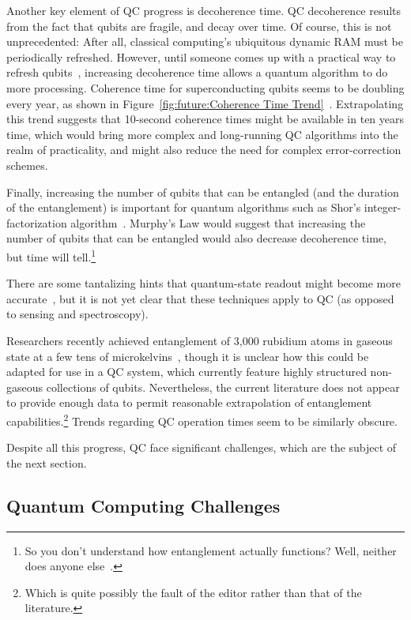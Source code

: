 Another key element of QC progress is decoherence time.
QC decoherence results from the fact that qubits are fragile, and
decay over time.
Of course, this is not unprecedented: After all, classical computing's
ubiquitous dynamic RAM must be periodically refreshed.
However, until someone comes up with a practical way to refresh
qubits~\cite{GiorgioColangelo2017QC-SpinAngleAmplitude},
increasing decoherence time allows a quantum algorithm to do more
processing.
Coherence time for superconducting qubits seems to be doubling every year,
as shown in
Figure~\ref{fig:future:Coherence Time Trend}~\cite{IBM2016QuantumExperience}.
Extrapolating this trend suggests that 10-second coherence times might
be available in ten years time, which would bring more complex and
long-running QC algorithms into the realm of practicality, and might
also reduce the need for complex error-correction schemes.

Finally, increasing the number of qubits that can be
entangled (and the duration of the entanglement) is important for
quantum algorithms such as Shor's integer-factorization
algorithm~\cite{Shor:1997:PAP:264393.264406,Kendon:2006:ERS:2011698.2011704}.
Murphy's Law would suggest that increasing the number of qubits that
can be entangled would also decrease decoherence time, but time will
tell.\footnote{
	So you don't understand how entanglement actually functions?
	Well, neither does anyone else~\cite{ScottAaronson2018QuantumInterp}.}

There are some tantalizing hints that quantum-state readout might become
more accurate~\cite{GiorgioColangelo2017QC-SpinAngleAmplitude},
but it is not yet clear that these techniques apply to QC
(as opposed to sensing and spectroscopy).

Researchers recently achieved entanglement of 3,000
rubidium atoms in gaseous state at a few tens of
microkelvins~\cite{RobertMcConnell2015QC-Entangle3000Atoms},
though it is unclear how this could be adapted for use in
a QC system, which currently feature highly structured non-gaseous
collections of qubits.
Nevertheless, the current literature does not appear to provide enough
data to permit reasonable extrapolation of entanglement capabilities.\footnote{
	Which is quite possibly the fault of the editor rather than that
	of the literature.}
Trends regarding QC operation times seem to be similarly obscure.

Despite all this progress, QC face significant challenges, which are
the subject of the next section.

\subsection{Quantum Computing Challenges}
\label{sec:future:Quantum Computing Challenges}

